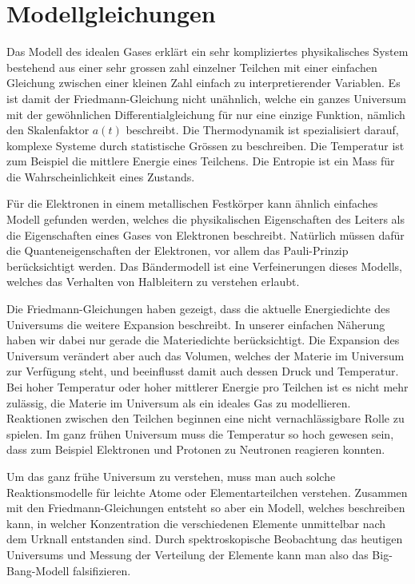 %
%
%
\chapter{Modellgleichungen%
\label{skript:chapter:modellgleichungen}}
\rhead{}
Das Modell des idealen Gases erklärt ein sehr kompliziertes physikalisches
System bestehend aus einer sehr grossen zahl einzelner Teilchen mit einer
einfachen Gleichung zwischen einer kleinen Zahl einfach zu interpretierender
Variablen.
Es ist damit der Friedmann-Gleichung nicht unähnlich, welche ein ganzes
Universum mit der gewöhnlichen Differentialgleichung für nur eine
einzige Funktion, nämlich den Skalenfaktor $a(t)$ beschreibt.
Die Thermodynamik ist spezialisiert darauf, komplexe Systeme durch
statistische Grössen zu beschreiben.
Die Temperatur ist zum Beispiel die mittlere Energie eines Teilchens.
Die Entropie ist ein Mass für die Wahrscheinlichkeit eines Zustands.

Für die Elektronen in einem metallischen Festkörper kann ähnlich
einfaches Modell gefunden werden, welches die physikalischen
Eigenschaften des Leiters als die Eigenschaften eines Gases von
Elektronen beschreibt.
Natürlich müssen dafür die Quanteneigenschaften der Elektronen,
vor allem das Pauli-Prinzip berücksichtigt werden.
Das Bändermodell ist eine Verfeinerungen dieses Modells, welches
das Verhalten von Halbleitern zu verstehen erlaubt.

Die Friedmann-Gleichungen haben gezeigt, dass die aktuelle Energiedichte
des Universums die weitere Expansion beschreibt.
In unserer einfachen Näherung haben wir dabei nur gerade die
Materiedichte berücksichtigt.
Die Expansion des Universum verändert aber auch das
Volumen, welches der Materie im Universum zur Verfügung steht,
und beeinflusst damit auch dessen Druck und Temperatur.
Bei hoher Temperatur oder hoher mittlerer Energie pro Teilchen
ist es nicht mehr zulässig, die Materie im
Universum als ein ideales Gas zu modellieren.
Reaktionen zwischen den Teilchen beginnen eine nicht vernachlässigbare
Rolle zu spielen.
Im ganz frühen Universum muss die Temperatur so hoch gewesen sein,
dass zum Beispiel Elektronen und Protonen zu Neutronen reagieren konnten.

Um das ganz frühe Universum zu verstehen, muss man auch solche
Reaktionsmodelle für leichte Atome oder Elementarteilchen verstehen.
Zusammen mit den Friedmann-Gleichungen entsteht so aber ein
Modell, welches beschreiben kann, in welcher Konzentration die
verschiedenen Elemente unmittelbar nach dem Urknall entstanden sind.
Durch spektroskopische Beobachtung das heutigen Universums und
Messung der Verteilung der Elemente kann man also das Big-Bang-Modell
falsifizieren.

